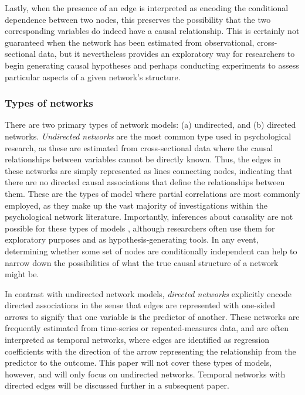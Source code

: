 Lastly, when the presence of an edge is interpreted as encoding the conditional dependence between two nodes, this preserves the possibility that the two corresponding variables do indeed have a causal relationship. This is certainly not guaranteed when the network has been estimated from observational, cross-sectional data, but it nevertheless provides an exploratory way for researchers to begin generating causal hypotheses and perhaps conducting experiments to assess particular aspects of a given network's structure.

\subsubsection{Types of networks}
There are two primary types of network models: (a) undirected, and (b) directed networks. \textit{Undirected networks} are the most common type used in psychological research, as these are estimated from cross-sectional data where the causal relationships between variables cannot be directly known. Thus, the edges in these networks are simply represented as lines connecting nodes, indicating that there are no directed causal associations that define the relationships between them. These are the types of model where partial correlations are most commonly employed, as they make up the vast majority of investigations within the psychological network literature. Importantly, inferences about causality are not possible for these types of models \cite{ryan2019dags}, although researchers often use them for exploratory purposes and as hypothesis-generating tools. In any event, determining whether some set of nodes are conditionally independent can help to narrow down the possibilities of what the true causal structure of a network might be.

In contrast with undirected network models, \textit{directed networks} explicitly encode directed associations in the sense that edges are represented with one-sided arrows to signify that one variable is the predictor of another. These networks are frequently estimated from time-series or repeated-measures data, and are often interpreted as temporal networks, where edges are identified as regression coefficients with the direction of the arrow representing the relationship from the predictor to the outcome. This paper will not cover these types of models, however, and will only focus on undirected networks. Temporal networks with directed edges will be discussed further in a subsequent paper.

